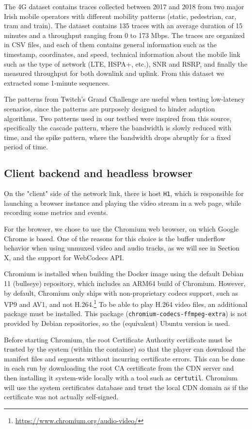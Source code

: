 The 4G dataset contains traces collected between 2017 and 2018 from two major Irish mobile operators with different mobility patterns (static, pedestrian, car, tram and train). The dataset contains 135 traces with an average duration of 15 minutes and a throughput ranging from 0 to 173 Mbps. The traces are organized in CSV files, and each of them contains general information such as the timestamp, coordinates, and speed, technical information about the mobile link such as the type of network (LTE, HSPA+, etc.), SNR and RSRP, and finally the measured throughput for both downlink and uplink. From this dataset we extracted some 1-minute sequences. %

The patterns from Twitch's Grand Challenge are useful when testing low-latency scenarios, since the patterns are purposely designed to hinder adaption algorithms. Two patterns used in our testbed were inspired from this source, specifically the cascade pattern, where the bandwidth is slowly reduced with time, and the spike pattern, where the bandwidth drops abruptly for a fixed period of time.

\subsection{Client backend and headless browser}
\label{sec:eval/testbed/backend}

On the "client" side of the network link, there is host \texttt{H1}, which is responsible for launching a browser instance and playing the video stream in a web page, while recording some metrics and events.

For the browser, we chose to use the Chromium web browser, on which Google Chrome is based. One of the reasons for this choice is the buffer underflow behavior when using unmuxed video and audio tracks, as we will see in Section X, and the support for WebCodecs API.

Chromium is installed when building the Docker image using the default Debian 11 (bullseye) repository, which includes an ARM64 build of Chromium. However, by default, Chromium only ships with non-proprietary codecs support, such as VP9 and AV1, and not H.264.\footnote{\url{https://www.chromium.org/audio-video/}} To be able to play H.264 video files, an additional package must be installed. This package (\texttt{chromium-codecs-ffmpeg-extra}) is not provided by Debian repositories, so the (equivalent) Ubuntu version is used.

Before starting Chromium, the root Certificate Authority certificate must be trusted by the system (within the container) so that the player can download the manifest files and segments without incurring certificate errors. This can be done in each run by downloading the root CA certificate from the CDN server and then installing it system-wide locally with a tool such as \texttt{certutil}. Chromium will use the system certificates database and trust the local CDN domain as if the certificate was not actually self-signed.

